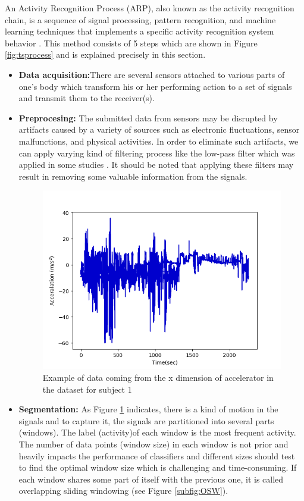 An Activity Recognition Process (ARP), also known as the activity recognition chain, is a sequence of signal processing, pattern recognition, and machine learning techniques that implements a specific activity recognition system behavior \cite{bulling2014tutorial}. This method consists of 5 steps which are shown in Figure \ref{fig:tsprocess} and is explained precisely in this section.
\begin{itemize}
\item \textbf{Data acquisition:}There are several sensors attached to various parts of one's body which transform his or her performing action to a set of signals and transmit them to the receiver(s). 
\item \textbf{Preprocesing:} The submitted data from sensors may be disrupted by artifacts caused
by a variety of sources such as electronic fluctuations, sensor malfunctions, and physical activities. In order to eliminate such artifacts, we can apply varying kind of filtering process like the low-pass filter which was applied in some studies \cite{morris2014recofit}. It should be noted that applying these filters may result in removing some valuable information from the signals. 


\begin{figure}[h]
    \centering
    \includegraphics[width=.4\textwidth]{Figures/signal.png}
    \caption{Example of data coming from the x dimension of accelerator in the dataset for subject 1  }
    \label{fig:signal}
\end{figure}

\item \textbf{Segmentation:}
As Figure \ref{fig:signal} indicates, there is a kind of motion in the signals and to capture it, the signals are partitioned into several parts (windows). The label (activity)of each window is the most frequent activity. The number of data points (window size) in each window is not prior and heavily impacts the performance of classifiers \cite{bulling2014tutorial} and different sizes should test to find the optimal window size which is challenging and time-consuming. If each window shares some part of itself with the previous one, it is called overlapping sliding windowing (see Figure \ref{subfig:OSW}).  


\end{itemize}
